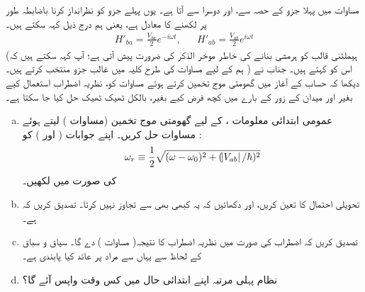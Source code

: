 مساوات  میں پہلا جزو  کے  حصہ سے، اور دوسرا  سے آتا ہے۔ یوں پہلے جزو کو نظرانداز کرنا باضابطہ طور پر  لکھنے کا معادل ہے، یعنی ہم درج ذیل کہہ سکتے ہیں۔
\begin{align}\label{مساوات_تابع_مضطرب_کوسائن_ایک_جزو}
	H'_{ba}=\frac{V_{ba}}{2}e^{-i\omega t},&&H'_{ab}=\frac{V_{ab}}{2}e^{i\omega t}
\end{align}
(ہیملٹنی قالب کو ہرمشی بنانے کی خاطر موخر الذکر کی ضرورت پیش آتی ہے؛ آپ کہہ سکتے ہیں کہ ہم  کے لیے مساوات  کی طرح کلیہ میں غالب جزو منتخب کرتے ہیں۔ ) اس کو  کہتے ہیں۔ جناب  نے دیکھا کہ حساب کے آغاز میں گھومتی موج تخمین کرتے ہوئے مساوات  کو، نظریہ اضطراب استعمال کیے بغیر اور میدان کے زور کے بارے میں کچھ فرض کیے بغیر، بالکل ٹھیک ٹھیک حل کیا جا سکتا ہے۔
\begin{enumerate}[a.]
\item
 عمومی ابتدائی معلومات ،  کے لیے گھومتی موج تخمین (مساوات ) لیتے ہوئے مساوات  حل کریں۔ اپنے جوابات (  اور ) کو : 
\begin{align}
	\omega_r\equiv\frac{1}{2}\sqrt{(\omega-\omega_0)^2+(\abs{V_{ab}}/\hslash)^2}
\end{align}
کی صورت میں لکھیں۔
\item
 تحویلی احتمال کا تعین کریں، اور دکھائیں کہ یہ کبھی بھی  سے تجاوز نہیں کرتا۔ تصدیق کریں کہ  ہے۔
\item
 تصدیق کریں کہ  اضطراب کی صورت میں  نظریہ اضطراب کا نتیجہ( مساوات ) دے گا۔ سیاق و سباق کے لحاظ سے یہاں  سے مراد  پر عائد کیا پابندی ہے۔
\item
 نظام پہلی مرتبہ اپنے ابتدائی حال میں کس وقت واپس آئے گا؟
 \end{enumerate}



